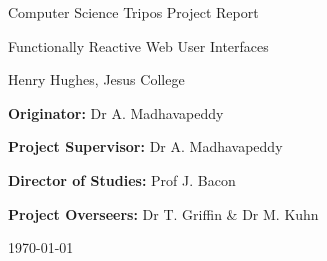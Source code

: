 \begin{titlepage}
  \vfil
  \centerline{\Large Computer Science Tripos Project Report}
    \vspace{0.4in}
    \centerline{\Huge Functionally Reactive Web User Interfaces }
    \vspace{0.4in}
    \centerline{\large Henry Hughes, Jesus College}
    \vspace{0.3in}
    \vfill
    \centerline{{\bf Originator:} Dr A. Madhavapeddy}
    \vspace{0.1in}
    \centerline{{\bf Project Supervisor:} Dr A. Madhavapeddy}
    \vspace{0.1in}
    \centerline{{\bf Director of Studies:} Prof J. Bacon}
    \vspace{0.1in}
    \centerline{{\bf Project Overseers:} Dr T. Griffin \& Dr M. Kuhn}
    \vspace{0.3in}
    \centerline{\large \today}
    \vfil
\end{titlepage}
